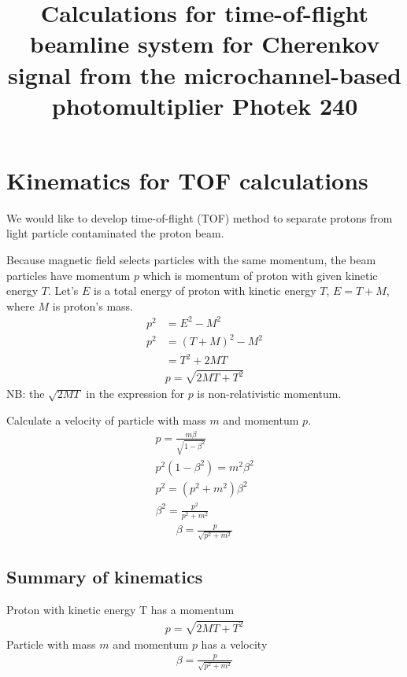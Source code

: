 \documentclass[english]{article}
\begin{document}
\title{Calculations for time-of-flight beamline system for Cherenkov signal from the microchannel-based photomultiplier Photek 240}

\maketitle

\section{Kinematics for TOF calculations}

We would like to develop time-of-flight (TOF) method to separate protons from light particle contaminated the proton beam. 

Because magnetic field selects particles with the same momentum, 
the beam particles have momentum $p$ which is momentum of proton with given kinetic energy $T$. 
Let's $E$ is a total energy of proton with kinetic energy $T$, $E = T+M$, where $M$ is proton's mass. 
\begin{align*}
p^2 & = E^2 - M^2 \\
p^2 & = (T+M)^2 - M^2 \\
& = T^2 + 2MT
\end{align*}
\begin{align}
p = \sqrt{2MT+T^2}
\end{align}
%
NB: the $\sqrt{2MT}$ in the expression for $p$ is non-relativistic momentum. 

Calculate a velocity of particle with mass $m$ and momentum $p$.
%
\begin{align*}
p = \frac{m\beta}{\sqrt{1-\beta^2}} \\ 
p^2(1-\beta^2) = m^2\beta^2 \\ 
p^2 = (p^2+m^2)\beta^2 \\ 
\beta^2 = \frac{p^2}{p^2+m^2}
\end{align*}
%
\begin{align}
\beta = \frac{p}{\sqrt{p^2+m^2}}
\end{align}

\subsection*{Summary of kinematics}

Proton with kinetic energy T has a momentum 
\begin{align*}
p = \sqrt{2MT+T^2}
\end{align*}
Particle with mass $m$ and momentum $p$ has a velocity
\begin{align*}
\beta = \frac{p}{\sqrt{p^2+m^2}}
\end{align*}
\end{document}
